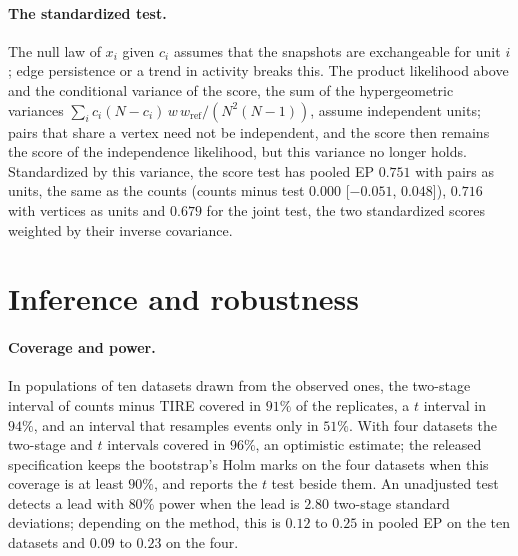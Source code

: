 \documentclass[11pt]{article}
\theoremstyle{dsplain}
\theoremstyle{definition}
\begin{document}
\paragraph{The standardized test.} The null law of $x_i$ given $c_i$ assumes that the snapshots
are exchangeable for unit $i$; edge persistence or a trend in activity breaks this. The product likelihood
above and the conditional variance of the score, the sum of the hypergeometric variances
$\sum_i c_i (N - c_i)\,w\,w_{\mathrm{ref}}/(N^2(N-1))$, assume independent units; pairs that share a vertex
need not be independent, and the score then remains the score of the independence likelihood, but this
variance no longer holds.
Standardized by this variance, the score test has pooled EP $0.751$ with pairs as units, the same as
the counts (counts minus test $0.000$ [$-0.051$, $0.048$]), $0.716$ with vertices as units and
$0.679$ for the joint test, the two standardized scores weighted by their inverse covariance.

\section{Inference and robustness}
\label{app:inference}

\paragraph{Coverage and power.} In populations of ten datasets drawn from the observed ones, the two-stage
interval of counts minus TIRE covered in $91\%$ of the replicates, a $t$ interval in $94\%$, and an
interval that resamples events only in $51\%$. With four datasets the two-stage and $t$ intervals covered
in $96\%$, an optimistic estimate; the released specification keeps the bootstrap's Holm marks on the four
datasets when this coverage is at least $90\%$, and reports the $t$ test beside them. An unadjusted test
detects a lead with $80\%$ power when the lead is $2.80$ two-stage standard deviations; depending on the
method, this is $0.12$ to $0.25$ in pooled EP on the ten datasets and $0.09$ to $0.23$ on the four.
\end{document}
